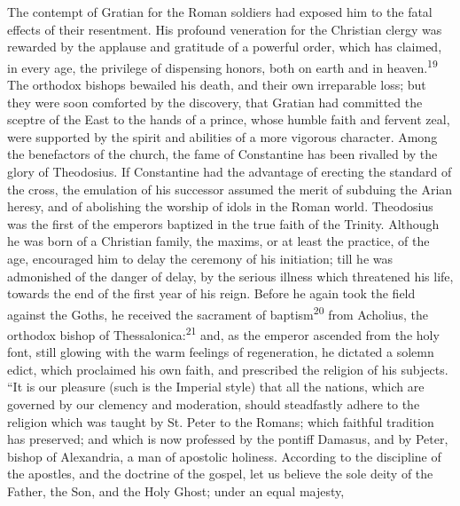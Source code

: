 

The contempt of Gratian for the Roman soldiers had exposed him to
the fatal effects of their resentment. His profound veneration
for the Christian clergy was rewarded by the applause and
gratitude of a powerful order, which has claimed, in every age,
the privilege of dispensing honors, both on earth and in heaven.\textsuperscript{19}
The orthodox bishops bewailed his death, and their own
irreparable loss; but they were soon comforted by the discovery,
that Gratian had committed the sceptre of the East to the hands
of a prince, whose humble faith and fervent zeal, were supported
by the spirit and abilities of a more vigorous character. Among
the benefactors of the church, the fame of Constantine has been
rivalled by the glory of Theodosius. If Constantine had the
advantage of erecting the standard of the cross, the emulation of
his successor assumed the merit of subduing the Arian heresy, and
of abolishing the worship of idols in the Roman world. Theodosius
was the first of the emperors baptized in the true faith of the
Trinity. Although he was born of a Christian family, the maxims,
or at least the practice, of the age, encouraged him to delay the
ceremony of his initiation; till he was admonished of the danger
of delay, by the serious illness which threatened his life,
towards the end of the first year of his reign. Before he again
took the field against the Goths, he received the sacrament of
baptism\textsuperscript{20} from Acholius, the orthodox bishop of Thessalonica:\textsuperscript{21}
and, as the emperor ascended from the holy font, still glowing
with the warm feelings of regeneration, he dictated a solemn
edict, which proclaimed his own faith, and prescribed the
religion of his subjects. “It is our pleasure (such is the
Imperial style) that all the nations, which are governed by our
clemency and moderation, should steadfastly adhere to the
religion which was taught by St. Peter to the Romans; which
faithful tradition has preserved; and which is now professed by
the pontiff Damasus, and by Peter, bishop of Alexandria, a man of
apostolic holiness. According to the discipline of the apostles,
and the doctrine of the gospel, let us believe the sole deity of
the Father, the Son, and the Holy Ghost; under an equal majesty,
